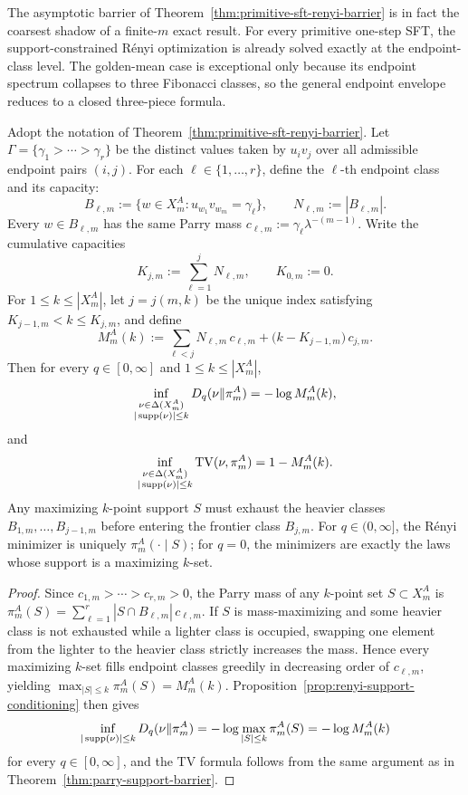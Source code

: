 The asymptotic barrier of Theorem~\ref{thm:primitive-sft-renyi-barrier} is in
fact the coarsest shadow of a finite-\(m\) exact result. For every primitive
one-step SFT, the support-constrained R\'enyi optimization is already solved
exactly at the endpoint-class level. The golden-mean case is exceptional only
because its endpoint spectrum collapses to three Fibonacci classes, so the
general endpoint envelope reduces to a closed three-piece formula.

\begin{theorem}
\label{thm:primitive-sft-endpoint-envelope}
Adopt the notation of Theorem~\ref{thm:primitive-sft-renyi-barrier}.
Let \(\Gamma=\{\gamma_1>\cdots>\gamma_r\}\) be the distinct values taken by
\(u_iv_j\) over all admissible endpoint pairs \((i,j)\). For each
\(\ell\in\{1,\dots,r\}\), define the \(\ell\)-th endpoint class and its
capacity:
\[
B_{\ell,m}
:=
\{w\in X_m^A:u_{w_1}v_{w_m}=\gamma_\ell\},
\qquad
N_{\ell,m}:=|B_{\ell,m}|.
\]
Every \(w\in B_{\ell,m}\) has the same Parry mass
\(c_{\ell,m}:=\gamma_\ell\lambda^{-(m-1)}\). Write the cumulative capacities
\[
K_{j,m}:=\sum_{\ell=1}^j N_{\ell,m},
\qquad K_{0,m}:=0.
\]
For \(1\le k\le |X_m^A|\), let \(j=j(m,k)\) be the unique index satisfying
\(K_{j-1,m}<k\le K_{j,m}\), and define
\[
M_m^A(k)
:=
\sum_{\ell<j}N_{\ell,m}\,c_{\ell,m}
+
\bigl(k-K_{j-1,m}\bigr)\,c_{j,m}.
\]
Then for every \(q\in[0,\infty]\) and \(1\le k\le |X_m^A|\),
\[
\inf_{\substack{\nu\in\Delta(X_m^A)\\ |\operatorname{supp}(\nu)|\le k}}
D_q(\nu\|\pi_m^A)
=
-\log M_m^A(k),
\]
and
\[
\inf_{\substack{\nu\in\Delta(X_m^A)\\ |\operatorname{supp}(\nu)|\le k}}
\operatorname{TV}(\nu,\pi_m^A)
=
1-M_m^A(k).
\]
Any maximizing \(k\)-point support \(S\) must exhaust the heavier classes
\(B_{1,m},\dots,B_{j-1,m}\) before entering the frontier class \(B_{j,m}\).
For \(q\in(0,\infty]\), the R\'enyi minimizer is uniquely
\(\pi_m^A(\cdot\mid S)\); for \(q=0\), the minimizers are exactly the laws
whose support is a maximizing \(k\)-set.
\end{theorem}

\begin{proof}
Since \(c_{1,m}>\cdots>c_{r,m}>0\), the Parry mass of any \(k\)-point set
\(S\subset X_m^A\) is
\(\pi_m^A(S)=\sum_{\ell=1}^r|S\cap B_{\ell,m}|\,c_{\ell,m}\).
If \(S\) is mass-maximizing and some heavier class is not exhausted while a
lighter class is occupied, swapping one element from the lighter to the
heavier class strictly increases the mass. Hence every maximizing \(k\)-set
fills endpoint classes greedily in decreasing order of
\(c_{\ell,m}\), yielding \(\max_{|S|\le k}\pi_m^A(S)=M_m^A(k)\).
Proposition~\ref{prop:renyi-support-conditioning} then gives
\[
\inf_{|\operatorname{supp}(\nu)|\le k}D_q(\nu\|\pi_m^A)
=-\log\max_{|S|\le k}\pi_m^A(S)
=-\log M_m^A(k)
\]
for every \(q\in[0,\infty]\), and the TV formula follows from the same
argument as in Theorem~\ref{thm:parry-support-barrier}.
\end{proof}

